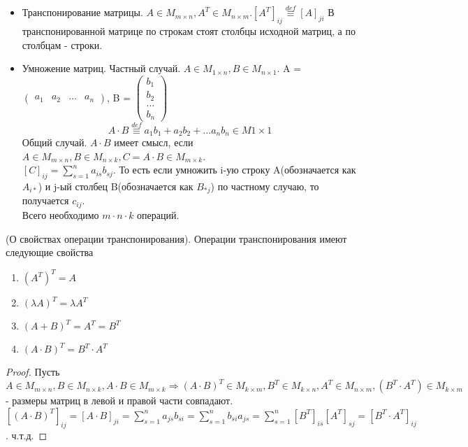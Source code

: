 \begin{itemize}
\begin{definition}
	\end{definition}
	\item Транспонирование матрицы. \(A\in M_{m\times n}, A^T\in M_{n\times m}. [A^T]_{ij}\overset{def}{\equiv} [A]_{ji}\)
	В транспонированной матрице по строкам стоят столбцы исходной матриц, а по столбцам - строки.
	\item Умножение матриц. Частный случай. \(A\in M_{1\times n}, B \in M_{n\times 1}\).
	A = \(\begin{pmatrix}
		a_1 & a_2 & \ldots & a_n
	\end{pmatrix}\), B = \(\begin{pmatrix}
		b_1 \\ b_2 \\ \ldots \\ b_n
	\end{pmatrix}\)
	\[A\cdot B \overset{def}{\equiv} a_1b_1 + a_2b_2 + \ldots a_nb_n \in M{1\times 1}\]
	Общий случай. \(A\cdot B\) имеет смысл, если \(A\in M_{m\times n}, B \in M_{n\times k}, C = A\cdot B\in M_{m\times k} \). \\
	\([C]_{ij} = \sum_{s = 1}^{n} a_{is}b_{sj}\). То есть если умножить i-ую строку A(обозначается как \(A_{i*}\)) и j-ый столбец B(обозначается как \(B_{*j}\)) по частному случаю, то получается \(c_{ij}\).\\ Всего необходимо \(m\cdot n\cdot k\) операций.
\end{itemize}
\begin{proposition}
	(О свойствах операции транспонирования). Операции транспонирования имеют следующие свойства 
	\begin{enumerate}
		\item \((A^T)^T = A\) 
		\item \((\lambda A)^T = \lambda A^T\)
		\item \((A+B)^T = A^T = B^T\)
		\item \((A\cdot B)^T = B^T\cdot A^T\)
	\end{enumerate}
\end{proposition}
\begin{proof}
	Пусть \(A\in M_{m\times n}, B\in M_{n\times k}, A\cdot B \in M_{m\times k} \Longrightarrow (A\cdot B)^T\in M_{k\times m}, B^T\in M_{k\times n}, A^T\in M_{n\times m}, (B^T\cdot A ^T)\in M_{k\times m}\) - размеры матриц в левой и правой части совпадают. \\
	\([(A\cdot B)^T]_{ij} = [A\cdot B]_{ji} = \sum_{s = 1}^{n}a_{js}b_{si} = \sum_{s=1}^{n}b_{si}a_{js} = \sum_{s=1}^{n}[B^T]_{is}[A^T]_{sj} = [B^T\cdot A^T]_{ij}\). ч.т.д.
\end{proof}
